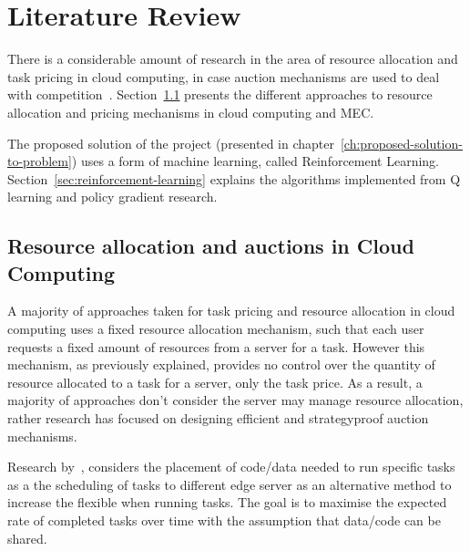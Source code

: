 \chapter{Literature Review}\label{ch:literature-review}
There is a considerable amount of research in the area of resource allocation and task pricing in cloud computing,
in case auction mechanisms are used to deal with competition~\citep{KUMAR2017234,Zhang2017,Du2019,Bi2019}.
Section~\ref{sec:resource-allocation-and-auctions-in-cloud-computing} presents the different approaches to resource
allocation and pricing mechanisms in cloud computing and MEC.

The proposed solution of the project (presented in chapter~\ref{ch:proposed-solution-to-problem}) uses a form of
machine learning, called Reinforcement Learning. Section~\ref{sec:reinforcement-learning} explains the algorithms
implemented from Q learning and policy gradient research.

\section{Resource allocation and auctions in Cloud Computing}\label{sec:resource-allocation-and-auctions-in-cloud-computing}
A majority of approaches taken for task pricing and resource allocation in cloud computing uses a fixed resource
allocation mechanism, such that each user requests a fixed amount of resources from a server for a task. However this
mechanism, as previously explained, provides no control over the quantity of resource allocated to a task for a server,
only the task price. As a result, a majority of approaches don't consider the server may manage resource allocation,
rather research has focused on designing efficient and strategyproof auction mechanisms.

Research by~\cite{vaji_infocom}, considers the placement of code/data needed to run specific tasks as a the scheduling
of tasks to different edge server as an alternative method to increase the flexible when running tasks. The goal is to
maximise the expected rate of completed tasks over time with the assumption that data/code can be shared.

